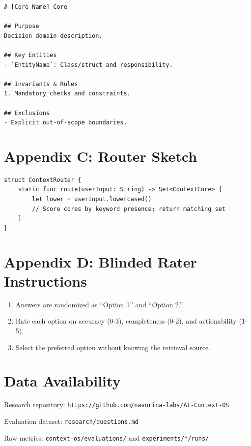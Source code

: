 \documentclass[11pt]{article}
\providecommand{\tightlist}{%
  \setlength{\itemsep}{2pt}%
  \setlength{\parskip}{0pt}%
}
\begin{document}
\begin{verbatim}
# [Core Name] Core

## Purpose
Decision domain description.

## Key Entities
- `EntityName`: Class/struct and responsibility.

## Invariants & Rules
1. Mandatory checks and constraints.

## Exclusions
- Explicit out-of-scope boundaries.
\end{verbatim}

\section{Appendix C: Router Sketch}\label{appendix-c-router-sketch}

\begin{verbatim}
struct ContextRouter {
    static func route(userInput: String) -> Set<ContextCore> {
        let lower = userInput.lowercased()
        // Score cores by keyword presence; return matching set
    }
}
\end{verbatim}

\section{Appendix D: Blinded Rater
Instructions}\label{appendix-d-blinded-rater-instructions}

\begin{enumerate}
\def\labelenumi{\arabic{enumi}.}
\tightlist
\item
  Answers are randomized as ``Option 1'' and ``Option 2.''
\item
  Rate each option on accuracy (0-3), completeness (0-2), and
  actionability (1-5).
\item
  Select the preferred option without knowing the retrieval source.
\end{enumerate}

\section{Data Availability}\label{data-availability}

Research repository:
\texttt{https://github.com/navorina-labs/AI-Context-OS}

Evaluation dataset: \texttt{research/questions.md}

Raw metrics: \texttt{context-os/evaluations/} and
\texttt{experiments/*/runs/}
\end{document}
